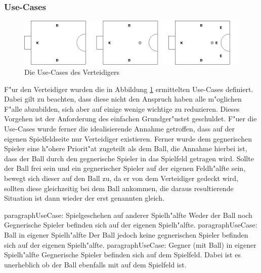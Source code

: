 \subsubsection{Use-Cases}
\begin{figure}[H]
	\centering
	\includegraphics[width=\ScaleIfNeeded]{Grafiken/KI/defender/useCases.png}
	\caption{Die Use-Cases des Verteidigers}
	\label{Usecases-Verteidigers}
\end{figure}

F"ur den Verteidiger wurden die in Abbildung \ref{Usecases-Verteidigers} ermittelten Use-Cases definiert. Dabei gilt zu beachten, dass diese nicht den Anspruch haben alle m"oglichen F"alle abzubilden, sich aber auf einige wenige wichtige zu reduzieren. Dieses Vorgehen ist der Anforderung des einfachen Grundger"ustet geschuldet. F"uer die Use-Cases wurde ferner die idealisierende Annahme getroffen, dass auf der eigenen Spielfeldseite nur Verteidiger existieren. Ferner wurde dem gegnerischen Spieler eine h"ohere Priorit"at zugeteilt als dem Ball, die Annahme hierbei ist, dass der Ball durch den gegnerische Spieler in das Spielfeld getragen wird. Sollte der Ball frei sein und ein gegnerischer Spieler auf der eigenen Feldh"alfte sein, bewegt sich dieser auf den Ball zu, da er von dem Verteidiger gedeckt wird, sollten diese gleichzeitig bei dem Ball ankommen, die daraus resultierende Situation ist dann wieder der erst genannten gleich.

paragraph{UseCase: Spielgeschehen auf anderer Spielh"alfte}
Weder der Ball noch Gegnerische Spieler befinden sich auf der eigenen Spielh"alfte.
paragraph{UseCase: Ball in eigener Spielh"alfte}
Der Ball jedoch keine gegnerischen Spieler befinden sich auf der eigenen Spielh"alfte.
paragraph{UseCase: Gegner (mit Ball) in eigener Spielh"alfte}
Gegnerische Spieler befinden sich auf dem Spielfeld. Dabei ist es unerheblich ob der Ball ebenfalls mit auf dem Spielfeld ist.

